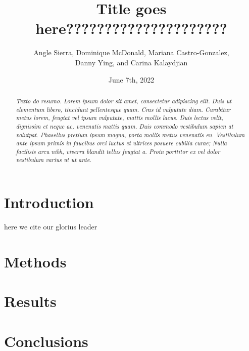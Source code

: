 \documentclass[11pt]{article}
\title {Title goes here?????????????????????\\[1ex]}
\author{
Angle Sierra, 
Dominique McDonald,
Mariana Castro-Gonzalez, \\
Danny Ying,
and Carina Kalaydjian \\[1ex]
}
\date{June 7th, 2022}
\newcommand{\abstractinenglishname}{Abstract}
\newenvironment{abstractinenglish}{
        \def\abstractname{\abstractinenglishname}
	\begin{abstract}
}{
        \end{abstract}
}
\begin{document}
\maketitle
\vspace{6pt}

\begin{abstractinenglish}
\emph{Texto do resumo. Lorem ipsum dolor sit amet, consectetur adipiscing elit. Duis ut elementum libero, tincidunt pellentesque quam. Cras id vulputate diam. Curabitur metus lorem, feugiat vel ipsum vulputate, mattis mollis lacus. Duis lectus velit, dignissim et neque ac, venenatis mattis quam. Duis commodo vestibulum sapien at volutpat. Phasellus pretium ipsum magna, porta mollis metus venenatis eu. Vestibulum ante ipsum primis in faucibus orci luctus et ultrices posuere cubilia curae; Nulla facilisis arcu nibh, viverra blandit tellus feugiat a. Proin porttitor ex vel dolor vestibulum varius ut ut ante.}
\end{abstractinenglish}

\section{Introduction}
here we cite \cite{Web1} our glorius leader 


\section{Methods}

\section{Results}

\section{Conclusions}



\newpage{}

\printbibliography

%
% 
\end{document}
